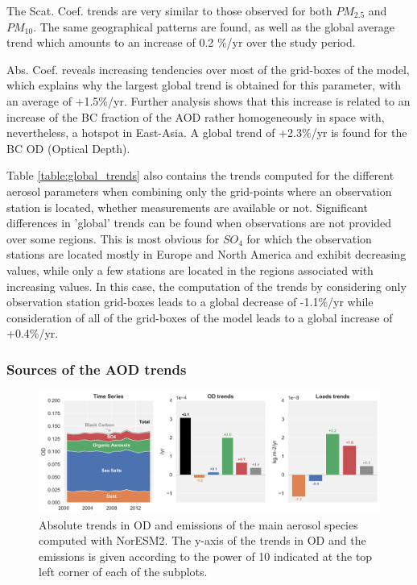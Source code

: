 \documentclass[journal abbreviation, manuscript]{copernicus}
\begin{document}
The Scat. Coef. trends are very similar to those observed for both $PM_{2.5}$ and $PM_{10}$. The same geographical patterns are found, as well as the global average trend which amounts to an increase of 0.2 \%/yr over the study period.

Abs. Coef. reveals increasing tendencies over most of the grid-boxes of the model, which explains why the largest global trend is obtained for this parameter, with an average of +1.5\%/yr. Further analysis shows that this increase is related to an increase of the BC fraction of the AOD rather homogeneously in space with, nevertheless, a hotspot in East-Asia. A global trend of +2.3\%/yr is found for the BC OD (Optical Depth).

Table \ref{table:global_trends} also contains the trends computed for the different aerosol parameters when combining only the grid-points where an observation station is located, whether measurements are available or not. Significant differences in 'global' trends can be found when observations are not provided over some regions. This is most obvious for $SO_{4}$ for which the observation stations are located mostly in Europe and North America and exhibit decreasing values, while only a few stations are located in the regions associated with increasing values. In this case, the computation of the trends by considering only observation station grid-boxes leads to a global decrease of -1.1\%/yr while consideration of all of the grid-boxes of the model leads to a global increase of +0.4\%/yr.


\subsubsection{Sources of the AOD trends}

\begin{figure}[t]
 \includegraphics[width=16cm]{../scripts/figs/abs_species_trends.png}
 \caption{Absolute trends in OD and emissions of the main aerosol species computed with NorESM2. The y-axis of the trends in OD and the emissions is given according to the power of 10 indicated at the top left corner of each of the subplots.}
 \label{fig:species}
\end{figure}
\end{document}
